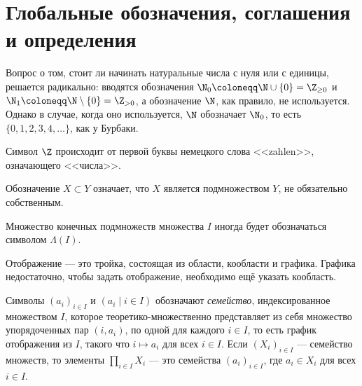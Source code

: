 \documentclass[
	extrafontsizes,
	11pt,
	hyphens,
]{memoir}
\begin{document}
\section{Глобальные обозначения, соглашения и определения}

\begin{notation}
Вопрос о том, стоит ли начинать натуральные числа с нуля или с единицы, решается радикально: вводятся обозначения
\(\N_0 \coloneqq \N \cup \{0\} = \Z_{\geq 0}\) и
\(\N_1 \coloneqq \N \setminus \{0\} = \Z_{> 0}\),
а обозначение \(\N\), как правило, не используется.
Однако в случае, когда оно используется, \(\N\) обозначает \(\N_0\), то есть \(\{0, 1, 2, 3, 4, \dots{}\}\), как у Бурбаки.
\end{notation}

\begin{remark}
Символ \(\Z\) происходит от первой буквы немецкого слова <<\textenglish{zahlen}>>, означающего <<числа>>.
\end{remark}

\begin{notation}
Обозначение \(X \subset Y\) означает, что \(X\) является подмножеством \(Y\), не обязательно собственным.
\end{notation}

\begin{notation}
Множество конечных подмножеств множества \(I\) иногда будет обозначаться символом \(\Lambda(I)\).
\end{notation}

\begin{convention}
Отображение --- это тройка, состоящая из области, кообласти и графика.
Графика недостаточно, чтобы задать отображение, необходимо ещё указать кообласть.
\end{convention}

\begin{notation}
Символы \((a_i)_{i \in I}\) и \((a_i \mid i \in I)\) обозначают \emph{семейство}, индексированное множеством \(I\), которое теоре\-ти\-ко-мно\-жес\-твен\-но представляет из себя множество упорядоченных пар \((i,a_i)\), по одной для каждого \(i \in I\), то есть график отображения из \(I\), такого что \(i \mapsto a_i\) для всех \(i \in I\).
Если \((X_i)_{i \in I}\) --- семейство множеств, то элементы \(\prod_{i \in I} X_i\) --- это семейства \((a_i)_{i \in I}\), где \(a_i \in X_i\) для всех \(i \in I\).
\end{notation}
\end{document}
